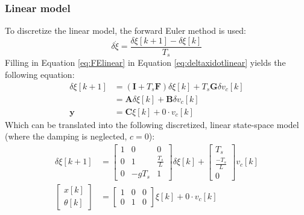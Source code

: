 \documentclass[a4paper,kul]{kulakarticle} %
\begin{document}
\subsubsection*{Linear model}
To discretize the linear model, the forward Euler method is used:
\begin{equation}
	\delta\dot{\xi} = \frac{\delta\xi[k+1]-\delta\xi[k]}{T_s}
	\label{eq:FElinear}
\end{equation}
Filling in Equation \ref{eq:FElinear} in Equation \ref{eq:deltaxidotlinear} yields the following equation:
\begin{equation}
\begin{split}
	\delta\xi[k+1] &= (\mathbf{I} + T_s\mathbf{F})\delta\xi[k] + T_s\mathbf{G}\delta v_c[k]\\
				&= \mathbf{A}\delta\xi[k]+ \mathbf{B}\delta v_c[k]\\
					\mathbf{y} &= \mathbf{C}\xi[k] + 0 \cdot v_c[k]
	\end{split}
	\label{eq:ABC}
	\end{equation}
	Which can be translated into the following discretized, linear state-space model (where the damping is neglected, $c = 0$):
	\begin{equation}
	\begin{split}
	\delta\xi[k+1] &= \begin{bmatrix}
	1&0&0\\0&1&\frac{T_s}{L}\\0&-gT_s&1
	\end{bmatrix}\delta\xi[k] + \begin{bmatrix}
	T_s\\ \frac{-T_s}{L}\\0
	\end{bmatrix}v_c[k]\\
	\begin{bmatrix}
	x[k]\\\theta[k]
	\end{bmatrix} &= \begin{bmatrix}
	1&0&0\\0&1&0
	\end{bmatrix}\xi[k] + 0 \cdot v_c[k]
	\end{split}
	\label{eq:sslineardiscr}
\end{equation}
\end{document}
